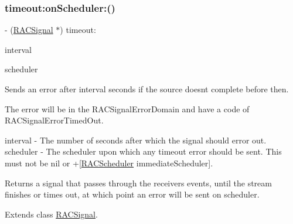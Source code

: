 \mbox{\label{category_r_a_c_signal_07_operations_08_a8c5f03f4cc8a132e91a985f3d5ccebc0}} 
\subsubsection{\texorpdfstring{timeout\+:on\+Scheduler\+:()}{timeout:onScheduler:()}\hspace{0.1cm}{\footnotesize\ttfamily [3/3]}}
{\footnotesize\ttfamily -\/ (\mbox{\hyperlink{interface_r_a_c_signal}{R\+A\+C\+Signal}} $\ast$) timeout\+: \begin{DoxyParamCaption}\item[{(N\+S\+Time\+Interval)}]{interval }\item[{onScheduler:(\mbox{\hyperlink{interface_r_a_c_scheduler}{R\+A\+C\+Scheduler}} $\ast$)}]{scheduler }\end{DoxyParamCaption}}

Sends an error after {\ttfamily interval} seconds if the source doesn\textquotesingle{}t complete before then.

The error will be in the R\+A\+C\+Signal\+Error\+Domain and have a code of R\+A\+C\+Signal\+Error\+Timed\+Out.

interval -\/ The number of seconds after which the signal should error out. scheduler -\/ The scheduler upon which any timeout error should be sent. This must not be nil or +\mbox{[}\mbox{\hyperlink{interface_r_a_c_scheduler}{R\+A\+C\+Scheduler}} immediate\+Scheduler\mbox{]}.

Returns a signal that passes through the receiver\textquotesingle{}s events, until the stream finishes or times out, at which point an error will be sent on {\ttfamily scheduler}. 

Extends class \mbox{\hyperlink{interface_r_a_c_signal_a8c5f03f4cc8a132e91a985f3d5ccebc0}{R\+A\+C\+Signal}}.

\mbox{\label{category_r_a_c_signal_07_operations_08_a5b7a649ea4635f423b73cd4924652fe5}} 
